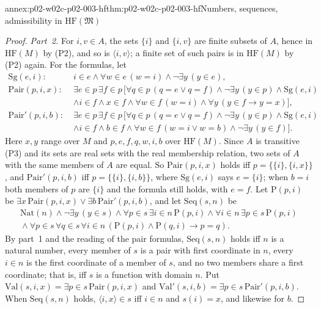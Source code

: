\begin{annexitem}{annex:p02-w02c-p02-003-hf}{thm:p02-w02c-p02-003-hf}{Numbers, sequences, admissibility in \(\mathrm{HF}(\mathfrak M)\)}
\begin{proof}
\emph{Part~2.}  For \(i,v\in A\), the sets \(\{i\}\) and \(\{i,v\}\) are
finite subsets of \(A\), hence in \(\mathrm{HF}(M)\) by (P2), and so is
\(\langle i,v\rangle\); a finite set of such pairs is in
\(\mathrm{HF}(M)\) by (P2) again.  For the formulas, let
\begin{align*}
\mathrm{Sg}(e,i)\colon\;& i\in e\land\forall w\in e\,(w=i)
 \land\neg\exists y\,(y\in e),\\
\mathrm{Pair}(p,i,x)\colon\;&\exists e\in p\,\exists f\in p\,
 \bigl[\forall q\in p\,(q=e\lor q=f)\land\neg\exists y\,(y\in p)
 \land\mathrm{Sg}(e,i)\\
 &\land i\in f\land x\in f\land\forall w\in f\,(w=i)
 \land\forall y\,(y\in f\to y=x)\bigr],\\
\mathrm{Pair}'(p,i,b)\colon\;&\exists e\in p\,\exists f\in p\,
 \bigl[\forall q\in p\,(q=e\lor q=f)\land\neg\exists y\,(y\in p)
 \land\mathrm{Sg}(e,i)\\
 &\land i\in f\land b\in f\land\forall w\in f\,(w=i\lor w=b)
 \land\neg\exists y\,(y\in f)\bigr].
\end{align*}
Here \(x,y\) range over \(M\) and \(p,e,f,q,w,i,b\) over
\(\mathrm{HF}(M)\).  Since \(A\) is transitive (P3) and its sets are real
sets with the real membership relation, two sets of \(A\) with the same
members of \(A\) are equal.  So \(\mathrm{Pair}(p,i,x)\) holds iff
\(p=\{\{i\},\{i,x\}\}\), and \(\mathrm{Pair}'(p,i,b)\) iff
\(p=\{\{i\},\{i,b\}\}\), where \(\mathrm{Sg}(e,i)\) says \(e=\{i\}\); when \(b=i\) both members of \(p\) are \(\{i\}\)
and the formula still holds, with \(e=f\).  Let
\(\mathrm{P}(p,i)\) be \(\exists x\,\mathrm{Pair}(p,i,x)\lor
\exists b\,\mathrm{Pair}'(p,i,b)\), and let \(\mathrm{Seq}(s,n)\) be
\[
\begin{gathered}
\mathrm{Nat}(n)\land\neg\exists y\,(y\in s)
\land\forall p\in s\,\exists i\in n\,\mathrm{P}(p,i)
\land\forall i\in n\,\exists p\in s\,\mathrm{P}(p,i)\\
{}\land\forall p\in s\,\forall q\in s\,\forall i\in n\,
 (\mathrm{P}(p,i)\land\mathrm{P}(q,i)\to p=q).
\end{gathered}
\]
By part~1 and the reading of the pair formulas, \(\mathrm{Seq}(s,n)\)
holds iff \(n\) is a natural number, every member of \(s\) is a pair with
first coordinate in \(n\), every \(i\in n\) is the first coordinate of a
member of \(s\), and no two members share a first coordinate; that is, iff
\(s\) is a function with domain \(n\).  Put
\(\mathrm{Val}(s,i,x)=\exists p\in s\,\mathrm{Pair}(p,i,x)\) and
\(\mathrm{Val}'(s,i,b)=\exists p\in s\,\mathrm{Pair}'(p,i,b)\).  When
\(\mathrm{Seq}(s,n)\) holds, \(\langle i,x\rangle\in s\) iff \(i\in n\) and
\(s(i)=x\), and likewise for \(b\).


\end{proof}
\end{annexitem}
